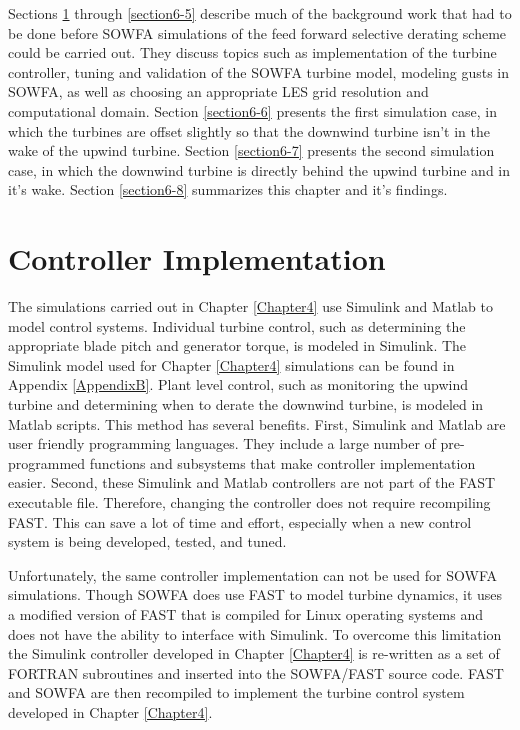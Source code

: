 Sections \ref{section6-2} through \ref{section6-5} describe much of the background work that had to be done before SOWFA simulations of the feed forward selective derating scheme could be carried out. They discuss topics such as implementation of the turbine controller, tuning and validation of the SOWFA turbine model, modeling gusts in SOWFA, as well as choosing an appropriate LES grid resolution and computational domain. Section \ref{section6-6} presents the first simulation case, in which the turbines are offset slightly so that the downwind turbine isn't in the wake of the upwind turbine. Section \ref{section6-7} presents the second simulation case, in which the downwind turbine is directly behind the upwind turbine and in it's wake. Section \ref{section6-8} summarizes this chapter and it's findings.




\section{Controller Implementation} \label{section6-2}

The simulations carried out in Chapter \ref{Chapter4} use Simulink and Matlab to model control systems. Individual turbine control, such as determining the appropriate blade pitch and generator torque, is modeled in Simulink. The Simulink model used for Chapter \ref{Chapter4} simulations can be found in Appendix \ref{AppendixB}. Plant level control, such as monitoring the upwind turbine and determining when to derate the downwind turbine, is modeled in Matlab scripts. This method has several benefits. First, Simulink and Matlab are user friendly programming languages.  They include a large number of pre-programmed functions and subsystems that make controller implementation easier. Second, these Simulink and Matlab controllers are not part of the FAST executable file. Therefore, changing the controller does not require recompiling FAST. This can save a lot of time and effort, especially when a new control system is being developed, tested, and tuned. 

Unfortunately, the same controller implementation can not be used for SOWFA simulations. Though SOWFA does use FAST to model turbine dynamics, it uses a modified version of FAST that is compiled for Linux operating systems and does not have the ability to interface with Simulink. To overcome this limitation the Simulink controller developed in Chapter \ref{Chapter4} is re-written as a set of FORTRAN subroutines and inserted into the SOWFA/FAST source code. FAST and SOWFA are then recompiled to implement the turbine control system developed in Chapter \ref{Chapter4}. 

